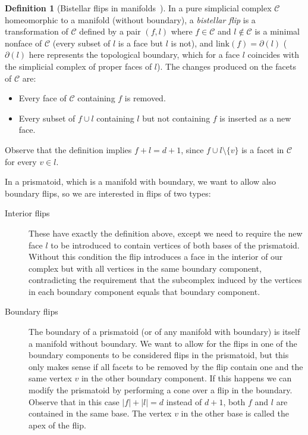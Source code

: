 \documentclass[12pt,a4paper]{article}
\theoremstyle{plain}
\theoremstyle{definition}
\newtheorem{definition}{Definition}
\begin{document}
\begin{definition}[Bistellar flips in manifolds~\cite{Lutz,Pachner}]
\label{Bistellar flips}
  In a pure simplicial complex $\mathcal{C}$ homeomorphic to a manifold (without boundary), a \emph{bistellar flip} is a transformation of $\mathcal{C}$ defined by a pair  $(f,l)$ where $f\in\mathcal{C}$ and $l\notin\mathcal{C}$ is a minimal nonface of $\mathcal{C}$ (every subset of $l$ is a face but $l$ is not), and $\text{link}(f)=\partial(l)$ ($\partial (l)$ here represents the topological boundary, which for a face $l$ coincides with the simplicial complex of proper faces of $l$). The changes produced on the facets of $\mathcal{C}$ are:
  \begin{itemize}
    \item Every face of $\mathcal{C}$ containing $f$ is removed.
    \item Every subset of  $f\cup l$ containing $l$ but not containing $f$ is inserted as a new face.
  \end{itemize}
\end{definition}

Observe that the definition implies $f+l=d+1$, since $f\cup l\setminus \{v\}$ is a facet in $\mathcal{C}$ for every $v\in l$.

In a prismatoid, which is a manifold with boundary, we want to allow also boundary flips, so we are interested in flips of two types:

\begin{description}
  \item[Interior flips] These have exactly the definition above, except we need to require the new face $l$ to be introduced to contain vertices of both bases of the prismatoid. Without this condition the flip introduces a face in the interior of our complex but with all vertices in the same boundary component, contradicting the requirement that the subcomplex induced by the vertices in each boundary component equals that boundary component.

    \item[Boundary flips]  The boundary of a prismatoid (or of any manifold with boundary) is itself a manifold without boundary. We want to allow for the flips in one of the  boundary components to be considered flips in the prismatoid, but this only makes sense if all facets to be removed by the flip contain one and the same vertex $v$ in the other boundary component. If this happens we can modify the prismatoid by performing a cone over a flip in the boundary. Observe that in this case $|f|+|l|=d$ instead of $d+1$, both $f$ and $l$ are contained in the same base. The vertex $v$ in the other base is called the apex of the flip.
\end{description}
\end{document}
